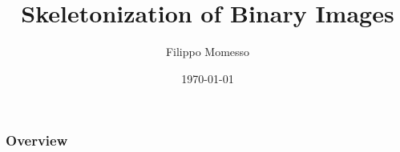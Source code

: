 \documentclass[9pt, t]{beamer}
\title[Signal Image \& Video]{Skeletonization of Binary Images} %
\author{Filippo Momesso} %
\institute[UniTN] %
{
University of Trento \\ %
\medskip
\textit{filippo.momesso@studenti.unitn.it} %
}
\date{\today} %
\begin{document}
\begin{frame}
  \titlepage %
\end{frame}

\begin{frame}
  \frametitle{Overview} %
  \tableofcontents %
\end{frame}






\end{document}
